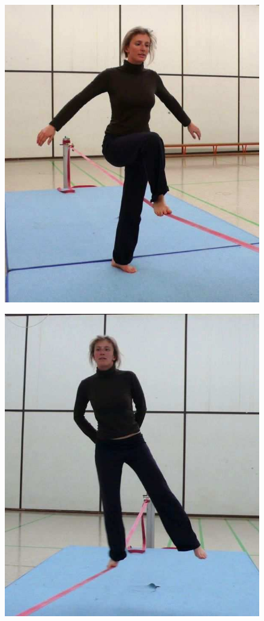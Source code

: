 \begin{figure}[htb]
	\centering
	\begin{minipage}[t]{0.28\linewidth}
		\centering
		\includegraphics[width=1\linewidth]{Pictures/slacklineAdvancedCrossoverStart}
		\label{fig:slacklineAdvancedCrossoverStart}
	\end{minipage}	
	\hfill
	\begin{minipage}[t]{0.3\linewidth}
		\centering
		\includegraphics[width=0.9\linewidth]{Pictures/slacklineAdvancedHandsBehindBack}

\end{minipage}
\end{figure}
